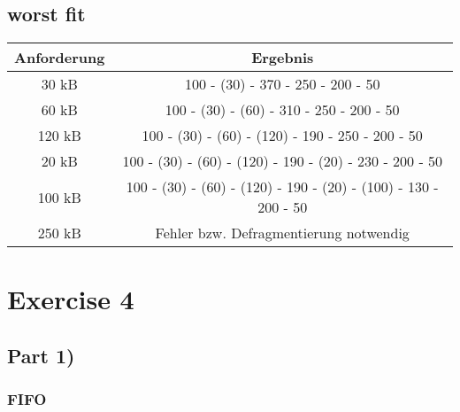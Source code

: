 \documentclass[10pt,a4paper]{article}
\begin{document}
\subsection*{worst fit}

\begin{tabular}{c|c}
  Anforderung & Ergebnis\\\hline
  30 kB & 100 - (30) - 370 - 250 - 200 - 50\\
  60 kB & 100 - (30) - (60) - 310 - 250 - 200 - 50\\
  120 kB & 100 - (30) - (60) - (120) - 190 - 250 - 200 - 50\\
  20 kB & 100 - (30) - (60) - (120) - 190 - (20) - 230 - 200 - 50\\
  100 kB & 100 - (30) - (60) - (120) - 190 - (20) - (100) - 130 - 200 - 50\\
  250 kB & Fehler bzw. Defragmentierung notwendig
\end{tabular}

\section*{Exercise 4}

\subsection*{Part 1)}

\subsubsection*{FIFO}
\end{document}
